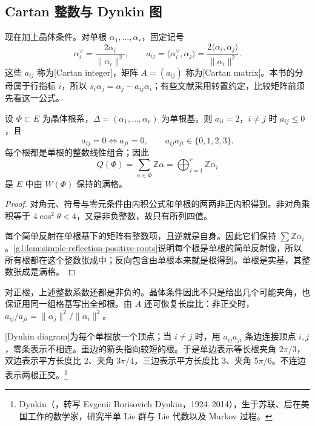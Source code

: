 \subsection{Cartan 整数与 Dynkin 图}
\label{g1:subsec:E02:02}

现在加上晶体条件。对单根 \(\alpha_1,\ldots,\alpha_r\)，固定记号
\begin{equation}\label{g1:eq:appendix-cartan-matrix}
	\alpha_i^\vee=\frac{2\alpha_i}{\lVert\alpha_i\rVert^2},\qquad
	a_{ij}=\langle\alpha_i^\vee,\alpha_j\rangle
	=\frac{2\langle\alpha_i,\alpha_j\rangle}{\lVert\alpha_i\rVert^2}.
\end{equation}
这些 \(a_{ij}\) 称为[Cartan integer]，矩阵 \(A=(a_{ij})\) 称为[Cartan matrix]。本书的分母属于行指标 \(i\)，所以 \(s_i\alpha_j=\alpha_j-a_{ij}\alpha_i\)；有些文献采用转置约定，比较矩阵前须先看这一公式。

\begin{proposition}\label{g1:prop:cartan-root-lattice}
	设 \(\Phi\subset E\) 为晶体根系，\(\Delta=(\alpha_1,\ldots,\alpha_r)\) 为单根基。则 \(a_{ii}=2\)，\(i\ne j\) 时 \(a_{ij}\le0\)，且
	\[
		a_{ij}=0\Longleftrightarrow a_{ji}=0,\qquad
		a_{ij}a_{ji}\in\{0,1,2,3\}.
	\]
	每个根都是单根的整数线性组合；因此
	\[
		Q(\Phi)=\sum_{\alpha\in\Phi}\mathbb Z\alpha
		=\bigoplus_{i=1}^r\mathbb Z\alpha_i
	\]
	是 \(E\) 中由 \(W(\Phi)\) 保持的满格。
\end{proposition}
\begin{proof}
	对角元、符号与零元条件由内积公式和单根的两两非正内积得到。非对角乘积等于 \(4\cos^2\theta<4\)，又是非负整数，故只有所列四值。

	每个简单反射在单根基下的矩阵有整数项，且逆就是自身。因此它们保持 \(\sum\mathbb Z\alpha_i\)。\cref{g1:lem:simple-reflection-positive-roots}说明每个根是单根的简单反射像，所以所有根都在这个整数张成中；反向包含由单根本来就是根得到。单根是实基，其整数张成是满格。
\end{proof}

对正根，上述整数系数还都是非负的。晶体条件因此不只是给出几个可能夹角，也保证用同一组格基写出全部根。由 \(A\) 还可恢复长度比：非正交时，\(a_{ij}/a_{ji}=\lVert\alpha_j\rVert^2/\lVert\alpha_i\rVert^2\)。

\ProseParagraphBreak

[Dynkin diagram]为每个单根放一个顶点；当 \(i\ne j\) 时，用 \(a_{ij}a_{ji}\) 条边连接顶点 \(i,j\)，零条表示不相连。重边的箭头指向较短的根。于是单边表示等长根夹角 \(2\pi/3\)，双边表示平方长度比 \(2\)、夹角 \(3\pi/4\)，三边表示平方长度比 \(3\)、夹角 \(5\pi/6\)。不连边表示两根正交。\footnote{Dynkin（，转写 Evgenii Borisovich Dynkin，1924--2014），生于苏联、后在美国工作的数学家，研究半单 Lie 群与 Lie 代数以及 Markov 过程。}

